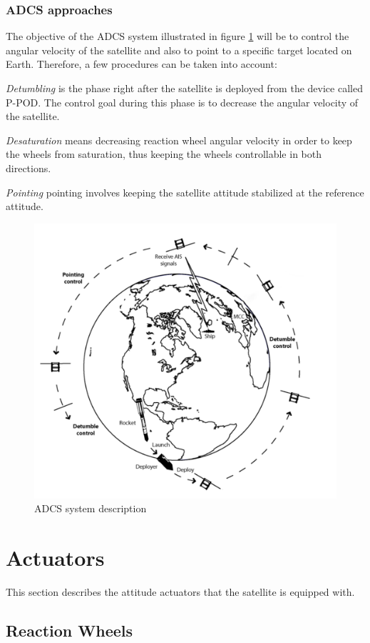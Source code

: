 \subsubsection{ADCS approaches}
The objective of the ADCS system illustrated in figure \ref{fig:cubee} will be to control the angular velocity of the satellite and also to point to a specific target located on Earth. Therefore, a few procedures can be taken into account:

\textit{Detumbling} is the phase right after the satellite is deployed from the device called P-POD. The control goal during this phase is to decrease the angular velocity of the satellite.

\textit{Desaturation} means decreasing reaction wheel angular velocity in order to keep the wheels from saturation, thus keeping the wheels controllable in both directions.

\textit{Pointing} pointing involves keeping the satellite attitude stabilized at the reference attitude.


\begin{figure}[H]
	\centering
	\includegraphics[width=0.7\linewidth]{figures/adcs}
	\caption{ADCS system description \cite{TH}}
	\label{fig:cubee}
\end{figure}




\section{Actuators}
 This section describes the attitude actuators that the satellite is equipped with.
\subsection{Reaction Wheels}

